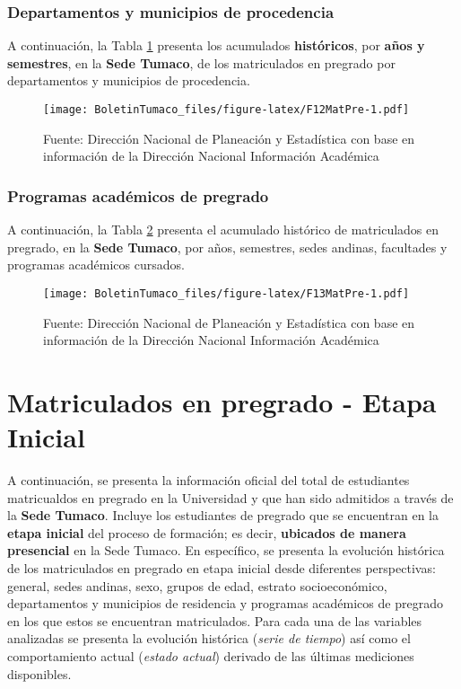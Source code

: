 \documentclass[
]{book}
\begin{document}
\hypertarget{departamentos-y-municipios-de-procedencia-1}{%
\subsubsection{Departamentos y municipios de procedencia}\label{departamentos-y-municipios-de-procedencia-1}}

A continuación, la Tabla \ref{fig:F12MatPre} presenta los acumulados \textbf{históricos}, por \textbf{años y semestres}, en la \textbf{Sede Tumaco}, de los matriculados en pregrado por departamentos y municipios de procedencia.

\begin{figure}
\centering
\texttt{[image: BoletinTumaco\_files/figure-latex/F12MatPre-1.pdf]}
\caption{\label{fig:F12MatPre}Fuente: Dirección Nacional de Planeación y Estadística con base en información de la Dirección Nacional Información Académica}
\end{figure}

\hypertarget{programas-acaduxe9micos-de-pregrado-1}{%
\subsubsection{Programas académicos de pregrado}\label{programas-acaduxe9micos-de-pregrado-1}}

A continuación, la Tabla \ref{fig:F13MatPre} presenta el acumulado histórico de matriculados en pregrado, en la \textbf{Sede Tumaco}, por años, semestres, sedes andinas, facultades y programas académicos cursados.

\begin{figure}
\centering
\texttt{[image: BoletinTumaco\_files/figure-latex/F13MatPre-1.pdf]}
\caption{\label{fig:F13MatPre}Fuente: Dirección Nacional de Planeación y Estadística con base en información de la Dirección Nacional Información Académica}
\end{figure}

\hypertarget{MatPreIni}{%
\section{Matriculados en pregrado - Etapa Inicial}\label{MatPreIni}}

A continuación, se presenta la información oficial del total de estudiantes matricualdos en pregrado en la Universidad y que han sido admitidos a través de la \textbf{Sede Tumaco}. Incluye los estudiantes de pregrado que se encuentran en la \textbf{etapa inicial} del proceso de formación; es decir, \textbf{ubicados de manera presencial} en la Sede Tumaco. En específico, se presenta la evolución histórica de los matriculados en pregrado en etapa inicial desde diferentes perspectivas: general, sedes andinas, sexo, grupos de edad, estrato socioeconómico, departamentos y municipios de residencia y programas académicos de pregrado en los que estos se encuentran matriculados. Para cada una de las variables analizadas se presenta la evolución histórica (\emph{serie de tiempo}) así como el comportamiento actual (\emph{estado actual}) derivado de las últimas mediciones disponibles.
\end{document}
